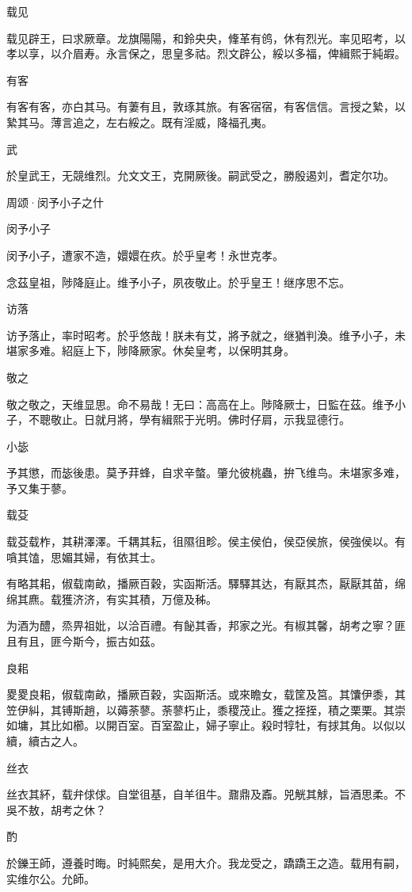 载见

载见辟王，曰求厥章。龙旗陽陽，和鈴央央，鞗革有鸧，休有烈光。率见昭考，以孝以享，以介眉寿。永言保之，思皇多祜。烈文辟公，綏以多福，俾緝熙于純嘏。

有客

有客有客，亦白其马。有萋有且，敦琢其旅。有客宿宿，有客信信。言授之縶，以縶其马。薄言追之，左右綏之。既有淫威，降福孔夷。

武

於皇武王，无競维烈。允文文王，克開厥後。嗣武受之，勝殷遏刘，耆定尔功。




周颂·闵予小子之什


闵予小子

闵予小子，遭家不造，嬛嬛在疚。於乎皇考！永世克孝。

念茲皇祖，陟降庭止。维予小子，夙夜敬止。於乎皇王！继序思不忘。

访落

访予落止，率时昭考。於乎悠哉！朕未有艾，將予就之，继猶判渙。维予小子，未堪家多难。紹庭上下，陟降厥家。休矣皇考，以保明其身。

敬之

敬之敬之，天维显思。命不易哉！无曰：高高在上。陟降厥士，日監在茲。维予小子，不聰敬止。日就月將，學有緝熙于光明。佛时仔肩，示我显德行。

小毖

予其懲，而毖後患。莫予荓蜂，自求辛螫。肇允彼桃蟲，拚飞维鸟。未堪家多难，予又集于蓼。

载芟

载芟载柞，其耕澤澤。千耦其耘，徂隰徂畛。侯主侯伯，侯亞侯旅，侯強侯以。有嗿其馌，思媚其婦，有依其士。

有略其耜，俶载南畝，播厥百穀，实函斯活。驛驛其达，有厭其杰，厭厭其苗，绵绵其麃。载獲济济，有实其積，万億及秭。

为酒为醴，烝畀祖妣，以洽百禮。有飶其香，邦家之光。有椒其馨，胡考之寧？匪且有且，匪今斯今，振古如茲。

良耜

畟畟良耜，俶载南畝，播厥百穀，实函斯活。或來瞻女，载筐及筥。其馕伊黍，其笠伊糾，其镈斯趙，以薅荼蓼。荼蓼朽止，黍稷茂止。獲之挃挃，積之栗栗。其崇如墉，其比如櫛。以開百室。百室盈止，婦子寧止。殺时犉牡，有捄其角。以似以續，續古之人。

丝衣

丝衣其紑，载弁俅俅。自堂徂基，自羊徂牛。鼐鼎及鼒。兕觥其觩，旨酒思柔。不吳不敖，胡考之休？

酌

於鑠王師，遵養时晦。时純熙矣，是用大介。我龙受之，蹻蹻王之造。载用有嗣，实维尔公。允師。

